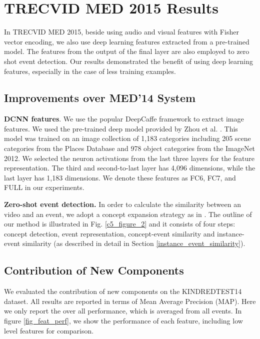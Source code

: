 
\chapter{TRECVID MED 2015 Results}

\ifpdf
\graphicspath{{Appendix3/Figs/Raster/}{Appendix3/Figs/PDF/}{Appendix3/Figs/}}
\else
\graphicspath{{Appendix3/Figs/Vector/}{Appendix3/Figs/}}
\fi
In TRECVID MED 2015, beside using audio and visual features with Fisher vector encoding, we also use deep learning features extracted from a pre-trained model. The features from the output of the final layer are also employed to zero shot event detection. Our results demonstrated the benefit of using deep learning features, especially in the case of less training examples.

\section{Improvements over MED'14 System}

\textbf{DCNN features}.\label{dcnnfeatures} We use the popular DeepCaffe \cite{jia2014caffe} framework to extract image features. We used the pre-trained deep model provided by Zhou et al. \cite{zhou2014learning}. This model was trained on an image collection of 1,183 categories including 205 scene categories from the Places Database and 978 object categories from the ImageNet 2012. We selected the neuron activations from the last three layers for the feature representation. The third and second-to-last layer has 4,096 dimensions, while the last layer has 1,183 dimensions. We denote these features as FC6, FC7, and FULL in our experiments.

\textbf{Zero-shot event detection.} In order to calculate the similarity between an video and an event, we adopt a concept expansion strategy as in \cite{chen2014event}. The outline of our method is illustrated in Fig. \ref{c5_figure_2} and it consists of four steps: concept detection, event representation, concept-event similarity and instance-event similarity (as described in detail in Section \ref{instance_event_similarity}).

\section{Contribution of New Components}
We evaluated the contribution of new components on the KINDREDTEST14 dataset. All results are reported in terms of Mean Average Precision (MAP). Here we only report the over all performance, which is averaged from all events. In figure \ref{fig_feat_perf}, we show the performance of each feature, including low level features for comparison. 

